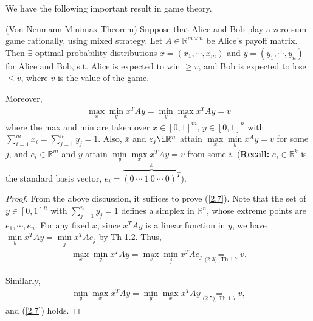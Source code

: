 We have the following important result in game theory. 
\begin{theorem}(Von Neumann Minimax Theorem)
    Suppose that Alice and Bob play a zero-sum game rationally, using mixed strategy. Let $A\in\mathbb{R}^{m\times n}$ be Alice's payoff matrix. Then $\exists$ optimal probability distributions $\bar{x} = \left( x_1, \cdots, x_m\right)$ and $\bar{y} = \left( y_1, \cdots, y_n\right)$ for Alice and Bob, s.t. Alice is expected to win $\geqslant v$, and Bob is expected to lose $\leqslant v$, where $v$ is the value of the game.

    Moreover,
    \begin{align}
        \max\limits_x \min\limits_y x^T A y = \min\limits_y \max\limits_x x^T A y = v \label{2.7}
    \end{align}
    where the max and min are taken over $x\in \left[0, 1\right]^m$, $y\in\left[0, 1\right]^n$ with $\sum\limits_{i=1}^m x_i = \sum\limits_{j=1}^n y_j = 1$. Also, $\bar{x}$ and $e_j\i\mathbb{R}^n$ attain $\max\limits_x \min\limits_y x^Ay = v$ for some $j$, and $e_i\in\mathbb{R}^m$ and $\bar{y}$ attain $\min\limits_y \max\limits_x x^TAy = v$ from some $i$. (\uline{\textbf{Recall:}} $e_i\in\mathbb{R}^k$ is the standard basis vector, $e_i = \overbrace{\left(0 \ \cdots \ 1 \ 0 \ \cdots \ 0 \right)^T}\limits^{k}$).
\end{theorem}
\begin{proof}
    From the above discussion, it suffices to prove (\ref{2.7}). Note that the set of $y\in[0,1]^n$ with $\sum\limits_{j=1}^n y_j = 1$ defines a simplex in $\mathbb{R}^n$, whose extreme points are $e_1, \cdots, e_n$. For any fixed $x$, since $x^TAy$ is a linear function in $y$, we have $\min\limits_y x^TAy = \min\limits_j x^TAe_j$ by Th 1.2. Thus, 
    \begin{align*}
        \max\limits_x \min\limits_y x^TAy = \max\limits_x \min\limits_j x^TAe_j  \underset{\text{(2.3), Th 1.7}}{=} v.
    \end{align*}

    Similarly, 
    \begin{align*}
        \min\limits_y \max\limits_x x^TAy = \min\limits_y \max\limits_x x^TAy \underset{\text{(2.5), Th 1.7}}{=} v,
    \end{align*}
    and (\ref{2.7}) holds.
\end{proof}

